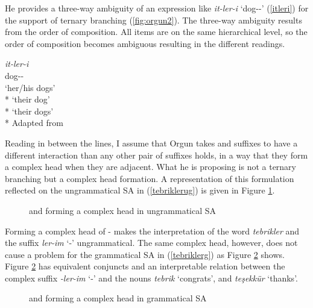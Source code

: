 He provides a three-way ambiguity of an expression like \textit{it-ler-i} `dog-{\Pl}-{\Poss}' (\ref{itleri}) for the support of ternary branching (\ref{fig:orgun2}). The three-way ambiguity results from the order of composition. All items are on the same hierarchical level, so the order of composition becomes ambiguous resulting in the different readings.
\begin{exe}
    \ex \label{itleri}
    \gll \textit{it-ler-i} \\ dog-{\Pl}-{\Poss} \\
    \glt `her/his dogs' \\* `their dog' \\* `their dogs' \\*
    \hfill Adapted from \cite{orgun1995flat}
\end{exe}

Reading in between the lines, I assume that Orgun takes {\Pl} and {\Poss} suffixes to have a different interaction than any other pair of suffixes holds, in a way that they form a complex head when they are adjacent. What he is proposing is not a ternary branching but a complex head formation. A representation of this formulation reflected on the ungrammatical SA in (\ref{tebriklerug}) is given in Figure \ref{fig:furkan1}.

\begin{figure}[hbt!]
    \centering
    \caption{{\Pl} and {\Poss} forming a complex head in ungrammatical SA}
    \label{fig:furkan1}
\end{figure}


Forming a complex head of {\Pl-\Poss} makes the interpretation of the word \textit{tebrikler} and the suffix \textit{ler-im} `{\Pl-\Poss}' ungrammatical. The same complex head, however, does not cause a problem for the grammatical SA in (\ref{tebriklerg}) as Figure \ref{fig:furkan2} shows. Figure \ref{fig:furkan2} has equivalent conjuncts and an interpretable relation between the complex suffix \textit{-ler-im} `{\Pl-\Poss}' and the nouns \textit{tebrik} `congrats', and \textit{teşekkür} `thanks'. 

\begin{figure}[hbt!]
    \centering
    \caption{{\Pl} and {\Poss} forming a complex head in grammatical SA}
    \label{fig:furkan2}
\end{figure}




